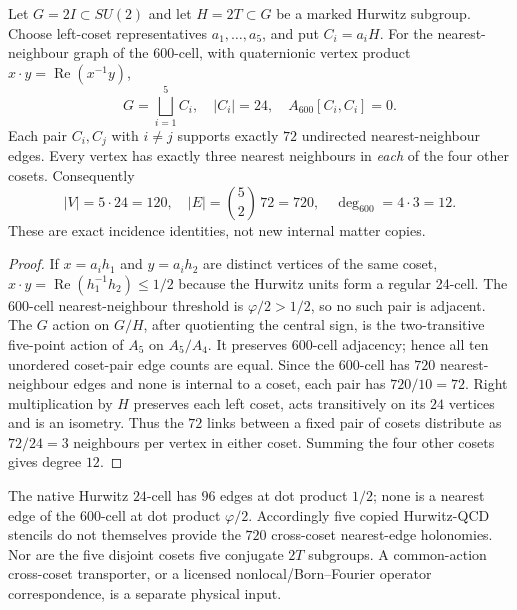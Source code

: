 \documentclass[11pt]{article}
\begin{document}
\begin{theorem}
\label{p1b:thm:v3023-five-coset-adjacency}
Let $G=2I\subset SU(2)$ and let $H=2T\subset G$ be a marked Hurwitz
subgroup. Choose left-coset representatives $a_1,\ldots,a_5$, and put
$C_i=a_iH$. For the nearest-neighbour graph of the 600-cell, with
quaternionic vertex product $x\cdot y=\operatorname{Re}(x^{-1}y)$,
\[
\boxed{G=\bigsqcup_{i=1}^5C_i,\quad |C_i|=24,\quad
 A_{600}[C_i,C_i]=0.}
\]
Each pair $C_i,C_j$ with $i\ne j$ supports exactly $72$ undirected
nearest-neighbour edges. Every vertex has exactly three nearest neighbours
in \emph{each} of the four other cosets. Consequently
\[
\boxed{|V|=5\cdot24=120,\quad |E|=\binom52\,72=720,\quad
 \deg_{600}=4\cdot3=12.}
\]
These are exact incidence identities, not new internal matter copies.
\end{theorem}
\begin{proof}
If $x=a_ih_1$ and $y=a_ih_2$ are distinct vertices of the same coset,
$x\cdot y=\operatorname{Re}(h_1^{-1}h_2)\le1/2$ because the Hurwitz
units form a regular 24-cell. The 600-cell nearest-neighbour threshold
is $\varphi/2>1/2$, so no such pair is adjacent. The $G$ action on
$G/H$, after quotienting the central sign, is the two-transitive
five-point action of $A_5$ on $A_5/A_4$. It preserves 600-cell adjacency;
hence all ten unordered coset-pair edge counts are equal. Since the
600-cell has $720$ nearest-neighbour edges and none is internal to a
coset, each pair has $720/10=72$. Right multiplication by $H$ preserves
each left coset, acts transitively on its $24$ vertices and is an
isometry. Thus the $72$ links between a fixed pair of cosets distribute
as $72/24=3$ neighbours per vertex in either coset. Summing the four
other cosets gives degree $12$.
\end{proof}

\begin{remark}
\label{p1b:rem:v3023-coset-physical-boundary}
The native Hurwitz $24$-cell has $96$ edges at dot product $1/2$;
none is a nearest edge of the 600-cell at dot product $\varphi/2$.
Accordingly five copied Hurwitz-QCD stencils do not themselves
provide the $720$ cross-coset nearest-edge holonomies. Nor are the
five disjoint cosets five conjugate $2T$ subgroups. A common-action
cross-coset transporter, or a licensed nonlocal/Born--Fourier
operator correspondence, is a separate physical input.
\end{remark}
\end{document}
